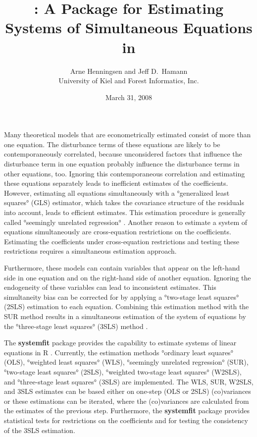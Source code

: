 \documentclass[12pt]{scrartcl}
\author{Arne Henningsen and Jeff D.\ Hamann\\
   \normalsize University of Kiel and Forest Informatics, Inc.}
\title{\pkg{systemfit}: A Package for Estimating Systems
of Simultaneous Equations in \proglang{R}}
\date{March 31, 2008}
\newcommand{\pkg}[1]{\mbox{\textbf{#1}}}
\newcommand{\proglang}[1]{\mbox{\textsf{#1}}}
\begin{document}
\maketitle

Many theoretical models that are econometrically estimated
consist of more than one equation.
The disturbance terms of these equations are likely
to be contemporaneously correlated,
because unconsidered factors
that influence the disturbance term in one equation
probably influence the disturbance terms in other equations, too.
Ignoring this contemporaneous correlation
and estimating these equations separately
leads to inefficient estimates of the coefficients.
However, estimating all equations simultaneously
with a °generalized least squares° (GLS) estimator,
which takes the covariance structure of the residuals into account,
leads to efficient estimates.
This estimation procedure is generally called
°seemingly unrelated regression° \citep[SUR,][]{zellner62}.
Another reason to estimate a system of equations simultaneously are
cross-equation restrictions on the coefficients.
Estimating the coefficients under cross-equation restrictions
and testing these restrictions
requires a simultaneous estimation approach.

Furthermore, these models can contain variables
that appear on the left-hand side in one equation
and on the right-hand side of another equation.
Ignoring the endogeneity of these variables can lead to inconsistent
estimates.
This simultaneity bias can be corrected for by
applying a °two-stage least squares° (2SLS) estimation
to each equation.
Combining this estimation method with the SUR method results
in a simultaneous estimation of the system of equations
by the °three-stage least squares° (3SLS) method
\citep{zellner62b}.

The \pkg{systemfit} package provides the capability to estimate
systems of linear equations in \proglang{R}
\citep{r-project}.
Currently, the estimation methods
°ordinary least squares° (OLS),
°weighted least squares° (WLS),
°seemingly unrelated regression° (SUR),
°two-stage least squares° (2SLS),
°weighted two-stage least squares° (W2SLS), and
°three-stage least squares° (3SLS)
are implemented.
The WLS, SUR, W2SLS, and 3SLS estimates can be based
either on one-step (OLS or 2SLS) (co)variances
or these estimations can be iterated,
where the (co)variances are calculated from the estimates of the previous step.
Furthermore,
the \pkg{systemfit} package
provides statistical tests for restrictions on the coefficients
and for testing the consistency of the 3SLS estimation.
\end{document}
